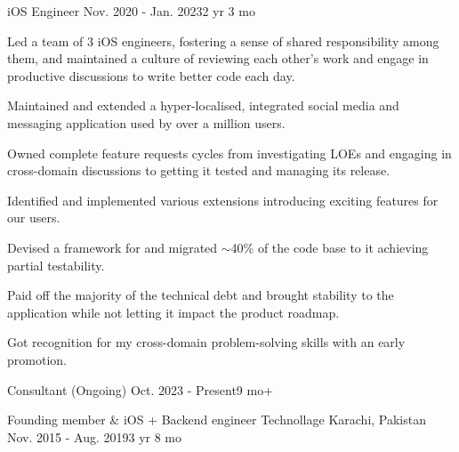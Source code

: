 \begin{cventries}
  \cventry
  {iOS Engineer} %
  {} %
  {} %
  {Nov. 2020 - Jan. 2023{\enskip\cdotp\enskip}2 yr 3 mo} %
  {
    \begin{cvitems} %
      \item {Led a team of 3 iOS engineers, fostering a sense of shared responsibility among them, and maintained a culture of reviewing each other's work and engage in productive discussions to write better code each day.}
      \item {Maintained and extended a hyper-localised, integrated social media and messaging application used by over a million users.}
      \item {Owned complete feature requests cycles from investigating LOEs and engaging in cross-domain discussions to getting it tested and managing its release.}
      \item {Identified and implemented various  extensions introducing exciting features for our users.}
      \item {Devised a framework for  and migrated $\sim$40\% of the code base to it achieving partial testability.}
      \item {Paid off the majority of the technical debt and brought stability to the application while not letting it impact the product roadmap.}
      \item {Got recognition for my cross-domain problem-solving skills with an early promotion.}
    \end{cvitems}
  }

  \cventry
  {Consultant (Ongoing)} %
  {}
  {}
  {Oct. 2023 - Present{\enskip\cdotp\enskip}9 mo+} %
  {
  }

  \cventry
  {Founding member \& iOS + Backend engineer} %
  {Technollage} %
  {Karachi, Pakistan} %
  {Nov. 2015 - Aug. 2019{\enskip\cdotp\enskip}3 yr 8 mo} %
  {
  }

\end{cventries}

